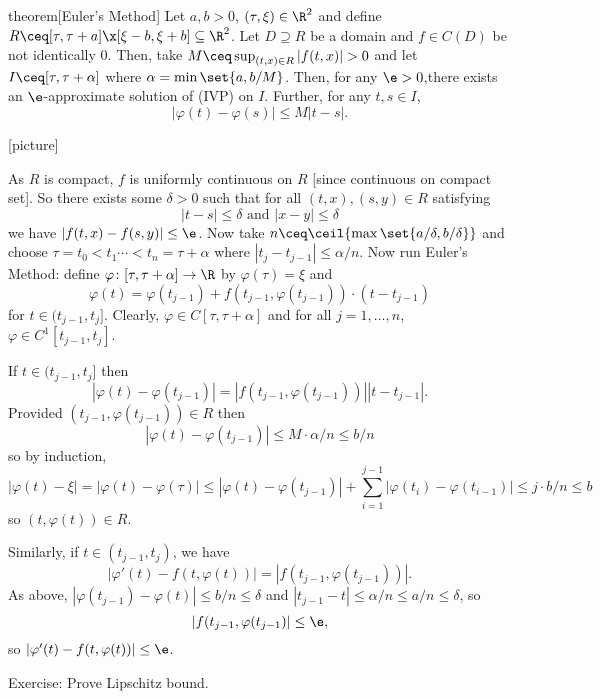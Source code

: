 \documentclass[class=article, crop=false]{standalone}
\renewcommand{\d}{\delta}
\renewcommand{\a}{\alpha}
\newcommand{\vph}{\varphi}
\begin{document}
\begin{result}{theorem}[Euler's Method]
  Let $a,b > 0$, $(\tau, \xi) \in \R^2$ and define $R \ceq [\tau, \tau+a] \x [\xi-b, \xi+b] \subseteq \R^2$. Let $D \supseteq R$ be a domain and $f \in C(D)$ be not identically $0$. Then, take $M \ceq \sup_{(t,x) \in R} |f(t,x)| > 0$ and let $I \ceq [\tau, \tau+\a]$ where $\a = \min \set{a, b/M}$. Then, for any $\e > 0$,there exists an $\e$-approximate solution of (IVP) on $I$. Further, for any $t,s \in I$,
    \[
      |\varphi(t)-\varphi(s)| \leq M|t-s|.
    \]
\end{result}
[picture]
\begin{pf}
  As $R$ is compact, $f$ is uniformly continuous on $R$ [since continuous on compact set]. So there exists some $\d > 0$ such that for all $(t,x), (s,y) \in R$ satisfying
    \[
      |t-s| \leq \d \text{ and } |x-y| \leq \d
    \]
  we have $|f(t,x)-f(s,y)| \leq \e$. Now take $n \ceq \ceil{\max \set{a/\d,b/\d}}$ and choose $\tau = t_0 < t_1 \cdots < t_n = \tau + \a$ where $|t_j-t_{j-1}| \leq \a/n$. Now run Euler's Method: define $\varphi\colon [\tau, \tau+\a] \to \R$ by $\varphi(\tau) = \xi$ and
    \[
      \varphi(t) = \varphi(t_{j-1}) + f(t_{j-1}, \varphi(t_{j-1})) \cdot (t-t_{j-1})
    \]
   for $t \in (t_{j-1},t_j]$.  Clearly, $\varphi \in C[\tau,\tau+\a]$ and for all $j=1,\ldots,n$, $\varphi \in C^1[t_{j-1}, t_j]$.

   If $t \in (t_{j-1},t_j]$ then
     \[
       |\varphi(t)-\varphi(t_{j-1})|  = |f(t_{j-1}, \varphi(t_{j-1}))| |t-t_{j-1}|.
     \]
   Provided $(t_{j-1}, \varphi(t_{j-1})) \in R$ then
     \[
       |\varphi(t) - \varphi(t_{j-1})| \leq M \cdot \a/n \leq b/n
     \]
   so by induction,
     \[
      |\varphi(t)-\xi| = |\vph(t) - \vph(\tau)| \leq |\varphi(t)- \varphi(t_{j-1})| + \sum_{i=1}^{j-1} |\varphi(t_i) - \varphi(t_{i-1})| \leq j \cdot b/n \leq b
     \]
   so $(t, \varphi(t)) \in R$.

   Similarly, if $t \in (t_{j-1},t_j)$, we have
     \[
       |\varphi '(t)- f(t,\varphi(t))| = |f(t_{j-1}, \varphi(t_{j-1}))|.
     \]
   As above, $|\vph(t_{j-1}) - \vph(t)| \leq b/n \leq \d$ and $|t_{j-1}-t| \leq \a/n \leq a/n \leq \d$, so
     \[
       |f(t_{j-1},\varphi(t_{j-1})| \leq \e,
     \]
   so $|\varphi'(t)-f(t,\varphi(t))| \leq \e$.

   Exercise: Prove Lipschitz bound.
\end{pf}
\end{document}

